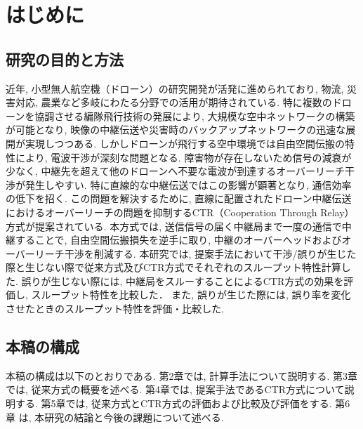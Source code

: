 \documentclass[a4paper,10.5pt]{ltjsarticle}
\begin{document}

\tableofcontents
\thispagestyle{empty}



\clearpage
\setcounter{page}{1}
\section{はじめに}

\subsection{研究の目的と方法}

近年, 小型無人航空機（ドローン）の研究開発が活発に進められており, 物流, 災害対応, 農業など多岐にわたる分野での活用が期待されている. 
特に複数のドローンを協調させる編隊飛行技術の発展により, 大規模な空中ネットワークの構築が可能となり, 映像の中継伝送や災害時のバックアップネットワークの迅速な展開が実現しつつある. 
しかしドローンが飛行する空中環境では自由空間伝搬の特性により, 電波干渉が深刻な問題となる. 
障害物が存在しないため信号の減衰が少なく, 中継先を超えて他のドローンへ不要な電波が到達するオーバーリーチ干渉が発生しやすい. 
特に直線的な中継伝送ではこの影響が顕著となり, 通信効率の低下を招く. 
この問題を解決するために, 直線に配置されたドローン中継伝送におけるオーバーリーチの問題を抑制するCTR（Cooperation Through Relay）方式が提案されている.
本方式では, 送信信号の届く中継局まで一度の通信で中継することで, 自由空間伝搬損失を逆手に取り, 中継のオーバーヘッドおよびオーバーリーチ干渉を削減する. 
本研究では, 提案手法において干渉/誤りが生じた際と生じない際で従来方式及びCTR方式でそれぞれのスループット特性計算した.
誤りが生じない際には, 中継局をスルーすることによるCTR方式の効果を評価し, スループット特性を比較した．
また, 誤りが生じた際には, 誤り率を変化させたときのスループット特性を評価・比較した.

\subsection{本稿の構成}
本稿の構成は以下のとおりである.
第2章では, 計算手法について説明する.
第3章では, 従来方式の概要を述べる.
第4章では, 提案手法であるCTR方式について説明する.
第5章では, 従来方式とCTR方式の評価および比較及び評価をする.
第6章 は, 本研究の結論と今後の課題について述べる.
\end{document}
